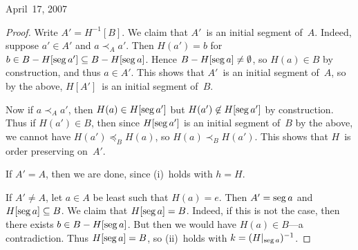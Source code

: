 \begin{lecture}{April~17, 2007}
\begin{proof}
Write \(A'=H^{-1}[B]\). We claim that \(A'\)~is an initial segment of~\(A\). Indeed, suppose \(a'\in A'\) and \(a\prec_A a'\). Then \(H(a')=b\) for \(b\in B-H[\operatorname{seg} a']\subseteq B-H[\operatorname{seg} a]\). Hence \(B-H[\operatorname{seg} a]\ne\emptyset\), so \(H(a)\in B\) by construction, and thus \(a\in A'\). This shows that \(A'\)~is an initial segment of~\(A\), so by the above, \(H[A']\)~is an initial segment of~\(B\).

Now if \(a\prec_A a'\), then \(H(a)\in H[\operatorname{seg} a']\) but \(H(a')\not\in H[\operatorname{seg} a']\) by construction. Thus if \(H(a')\in B\), then since \(H[\operatorname{seg} a']\) is an initial segment of~\(B\) by the above, we cannot have \(H(a')\preceq_B H(a)\), so \(H(a)\prec_B H(a')\). This shows that \(H\)~is order preserving on~\(A'\).

If \(A'=A\), then we are done, since (i)~holds with \(h=H\).

If \(A'\ne A\), let \(a\in A\) be least such that \(H(a)=e\). Then \(A'=\operatorname{seg} a\) and \(H[\operatorname{seg} a]\subseteq B\). We claim that \(H[\operatorname{seg} a]=B\). Indeed, if this is not the case, then there exists \(b\in B-H[\operatorname{seg} a]\). But then we would have \(H(a)\in B\)---a contradiction. Thus \(H[\operatorname{seg} a]=B\), so (ii)~holds with \(k=(H|_{\operatorname{seg} a})^{-1}\).
\end{proof}
\end{lecture}
